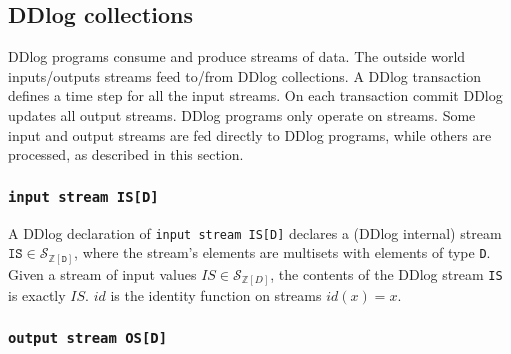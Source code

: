\documentclass[10pt]{article}
\newcommand{\code}[1]{\texttt{#1}}
\newcommand{\Z}{\mathbb{Z}}  %
\newcommand{\stream}[1]{\ensuremath{\mathcal{S}_{#1}}}
\newcommand{\id}{\ensuremath{\mathit{id}}} %
\begin{document}
\subsection{DDlog collections}

DDlog programs consume and produce streams of data.  The outside world
inputs/outputs streams feed to/from DDlog collections.  A DDlog
transaction defines a time step for all the input streams.  On each
transaction commit DDlog updates all output streams.  DDlog programs
only operate on streams.  Some input and output streams are fed
directly to DDlog programs, while others are processed, as described
in this section.

\subsubsection{\code{input stream IS[D]}}


A DDlog declaration of \code{input stream IS[D]} declares a (DDlog
internal) stream $\code{IS} \in \stream{\Z[\code{D}]}$, where the
stream's elements are multisets with elements of type \code{D}.  Given
a stream of input values $IS \in \stream{\Z[D]}$, the contents of the
DDlog stream \code{IS} is exactly $IS$.  $\id$ is the identity
function on streams $\id(x) = x$.

\subsubsection{\code{output stream OS[D]}}

\end{document}

